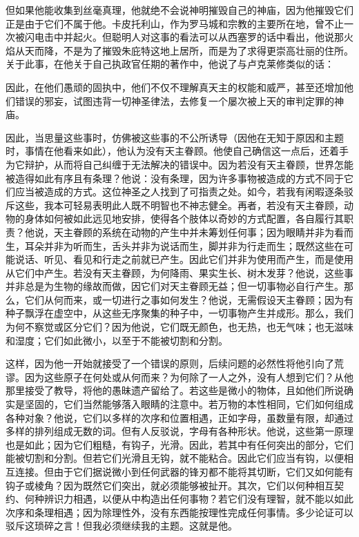 \par

但如果他能收集到丝毫真理，他就绝不会说神明摧毁自己的神庙，因为他摧毁它们正是由于它们不属于他。卡皮托利山，作为罗马城和宗教的主要所在地，曾不止一次被闪电击中并起火。但聪明人对这事的看法可以从西塞罗的话中看出，他说那火焰从天而降，不是为了摧毁朱庇特这地上居所，而是为了求得更崇高壮丽的住所。关于此事，在他关于自己执政官任期的著作中，他说了与卢克莱修类似的话：\par

\par

因此，在他们愚顽的固执中，他们不仅不理解真天主的权能和威严，甚至还增加他们错误的邪妄，试图违背一切神圣律法，去修复一个屡次被上天的审判定罪的神庙。\par

因此，当思量这些事时，仿佛被这些事的不公所诱导（因他在无知于原因和主题时，事情在他看来如此），他认为没有天主眷顾。他使自己确信这一点后，还着手为它辩护，从而将自己纠缠于无法解决的错误中。因为若没有天主眷顾，世界怎能被造得如此有序且有条理？他说：没有条理，因为许多事物被造成的方式不同于它们应当被造成的方式。这位神圣之人找到了可指责之处。如今，若我有闲暇逐条驳斥这些，我本可轻易表明此人既不明智也不神志健全。再者，若没有天主眷顾，动物的身体如何被如此远见地安排，使得各个肢体以奇妙的方式配置，各自履行其职责？他说，天主眷顾的系统在动物的产生中并未筹划任何事；因为眼睛并非为看而生，耳朵并非为听而生，舌头并非为说话而生，脚并非为行走而生；既然这些在可能说话、听见、看见和行走之前就已产生。因此它们并非为使用而产生，而是使用从它们中产生。若没有天主眷顾，为何降雨、果实生长、树木发芽？他说，这些事并非总是为生物的缘故而做，因它们对天主眷顾无益；但一切事物必自行产生。那么，它们从何而来，或一切进行之事如何发生？他说，无需假设天主眷顾；因为有种子飘浮在虚空中，从这些无序聚集的种子中，一切事物产生并成形。那么，我们为何不察觉或区分它们？因为他说，它们既无颜色，也无热，也无气味；也无滋味和湿度；它们如此微小，以至于不能被切割和分割。\par

这样，因为他一开始就接受了一个错误的原则，后续问题的必然性将他引向了荒谬。因为这些原子在何处或从何而来？为何除了一人之外，没有人想到它们？从他那里接受了教导，将他的愚昧遗产留给了。若这些是微小的物体，且如他们所说确实是坚固的，它们当然能够落入眼睛的注意中。若万物的本性相同，它们如何组成各种对象？他说，它们以多样的次序和位置相遇，正如字母，虽数量有限，却通过多样的排列组成无数的词。但有人反驳说，字母有各种形状。他说，这些第一原理也是如此；因为它们粗糙，有钩子，光滑。因此，若其中有任何突出的部分，它们能被切割和分割。但若它们光滑且无钩，就不能粘合。因此它们应当有钩，以便相互连接。但由于它们据说微小到任何武器的锋刃都不能将其切断，它们又如何能有钩子或棱角？因为既然它们突出，就必须能够被扯开。其次，它们以何种相互契约、何种辨识力相遇，以便从中构造出任何事物？若它们没有理智，就不能以如此次序和条理相遇；因为除理性外，没有东西能按理性完成任何事情。多少论证可以驳斥这琐碎之言！但我必须继续我的主题。这就是他。\par

